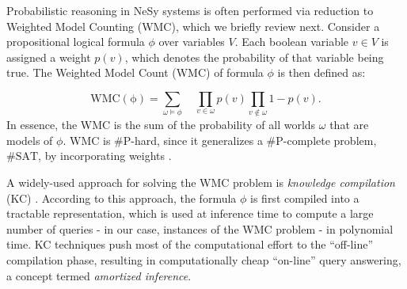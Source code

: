 Probabilistic reasoning in NeSy systems is often performed via reduction to Weighted Model Counting (WMC), which we briefly review next. Consider a propositional logical formula $\phi$ over variables $V$. Each boolean variable $v\in V$ is assigned a weight $p(v)$, which denotes the probability of that variable being true. The Weighted Model Count (WMC) of formula $\phi$ is then defined as:

\begin{equation} \label{eq:wmc}
    \mathrm{WMC (\phi)} = \sum_{\omega \models \phi} \quad \prod_{v \in \omega} p(v) \prod_{v \notin \omega} 1 - p(v).
\end{equation}
In essence, the WMC is the sum of the probability of all worlds $\omega$ that are models of $\phi$. WMC is $\#\mathrm{P}$-hard, since it generalizes a $\#\mathrm{P}$-complete problem, $\#\mathrm{SAT}$, by incorporating weights \cite{chavira2008probabilistic}.

A widely-used approach for solving the WMC problem is \textit{knowledge compilation} (KC) \cite{darwiche2002knowledge,chavira2008probabilistic}. According to this approach, the formula $\phi$ is first compiled into a tractable representation, which is used at inference time to compute a large number of queries - in our case, instances of the WMC problem - in polynomial time. KC techniques push most of the computational effort to the ``off-line'' compilation phase, resulting in computationally cheap ``on-line'' query answering, a concept termed \textit{amortized inference}.


